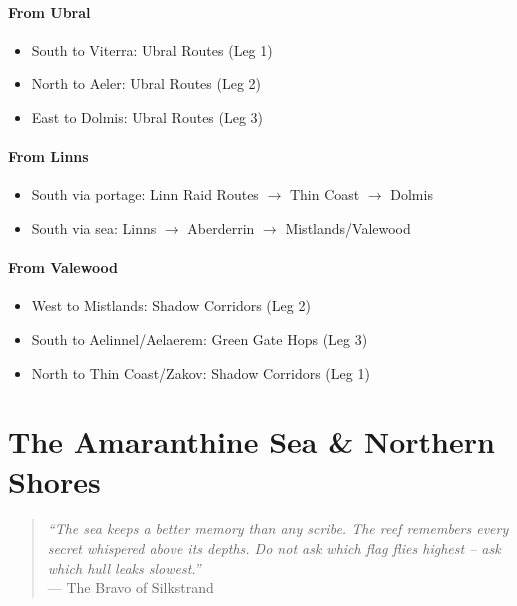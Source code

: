 \documentclass[12pt,oneside]{book}
\begin{document}
\subsection{From Ubral}
\begin{itemize}
\item South to Viterra: Ubral Routes (Leg 1)
\item North to Aeler: Ubral Routes (Leg 2)
\item East to Dolmis: Ubral Routes (Leg 3)
\end{itemize}

\subsection{From Linns}
\begin{itemize}
\item South via portage: Linn Raid Routes $\rightarrow$ Thin Coast $\rightarrow$ Dolmis
\item South via sea: Linns $\rightarrow$ Aberderrin $\rightarrow$ Mistlands/Valewood
\end{itemize}

\subsection{From Valewood}
\begin{itemize}
\item West to Mistlands: Shadow Corridors (Leg 2)
\item South to Aelinnel/Aelaerem: Green Gate Hops (Leg 3)
\item North to Thin Coast/Zakov: Shadow Corridors (Leg 1)
\end{itemize}

\newpage
\part{The Amaranthine Sea \& Northern Shores}

\begin{quote}
  \small
  \textit{``The sea keeps a better memory than any scribe. The reef remembers every secret whispered above its depths. Do not ask which flag flies highest -- ask which hull leaks slowest.''}
  \\ --- The Bravo of Silkstrand
\end{quote}
\end{document}
